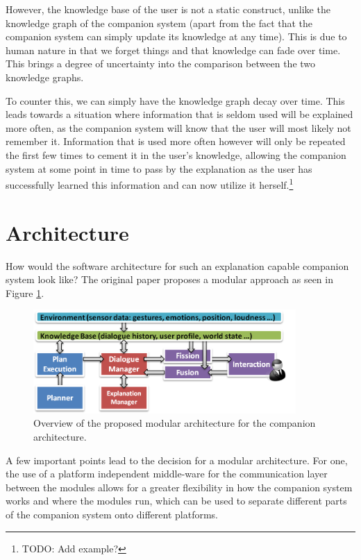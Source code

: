 \documentclass[a4paper]{article}
\begin{document}
However, the knowledge base of the user is not a static construct, unlike the knowledge graph of the companion system (apart from the fact that the companion system can simply update its knowledge at any time). This is due to human nature in that we forget things and that knowledge can fade over time. This brings a degree of uncertainty into the comparison between the two knowledge graphs.

To counter this, we can simply have the knowledge graph decay over time. This leads towards a situation where information that is seldom used will be explained more often, as the companion system will know that the user will most likely not remember it. Information that is used more often however will only be repeated the first few times to cement it in the user's knowledge, allowing the companion system at some point in time to pass by the explanation as the user has successfully learned this information and can now utilize it herself.\footnote{TODO: Add example?}

\section{Architecture}

How would the software architecture for such an explanation capable companion system look like? The original paper proposes a modular approach as seen in Figure \ref{fig:architecture}.

\begin{figure}[H]
	\centering
	\includegraphics[width=10cm]{arch.png}
	\caption{Overview of the proposed modular architecture for the companion architecture.}
	\label{fig:architecture}
\end{figure}

A few important points lead to the decision for a modular architecture. For one, the use of a platform independent middle-ware for the communication layer between the modules allows for a greater flexibility in how the companion system works and where the modules run, which can be used to separate different parts of the companion system onto different platforms.
\end{document}
